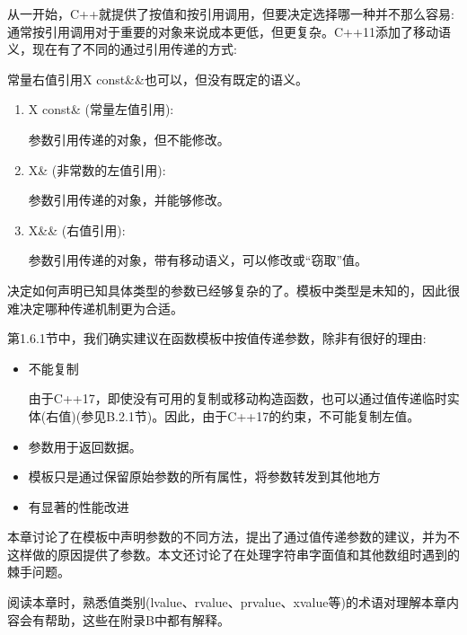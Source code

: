 从一开始，C++就提供了按值和按引用调用，但要决定选择哪一种并不那么容易:通常按引用调用对于重要的对象来说成本更低，但更复杂。C++11添加了移动语义，现在有了不同的通过引用传递的方式:

\begin{tcolorbox}[colback=webgreen!5!white,colframe=webgreen!75!black]
\hspace*{0.75cm}常量右值引用X const\&\&也可以，但没有既定的语义。
\end{tcolorbox}

\begin{enumerate}
\item 
X const\& (常量左值引用):

参数引用传递的对象，但不能修改。

\item 
X\& (非常数的左值引用):

参数引用传递的对象，并能够修改。

\item 
X\&\& (右值引用):

参数引用传递的对象，带有移动语义，可以修改或“窃取”值。
\end{enumerate}

决定如何声明已知具体类型的参数已经够复杂的了。模板中类型是未知的，因此很难决定哪种传递机制更为合适。

第1.6.1节中，我们确实建议在函数模板中按值传递参数，除非有很好的理由:

\begin{itemize}
\item 
不能复制

\begin{tcolorbox}[colback=webgreen!5!white,colframe=webgreen!75!black]
\hspace*{0.75cm}由于C++17，即使没有可用的复制或移动构造函数，也可以通过值传递临时实体(右值)(参见B.2.1节)。因此，由于C++17的约束，不可能复制左值。
\end{tcolorbox}

\item 
参数用于返回数据。

\item 
模板只是通过保留原始参数的所有属性，将参数转发到其他地方

\item 
有显著的性能改进
\end{itemize}

本章讨论了在模板中声明参数的不同方法，提出了通过值传递参数的建议，并为不这样做的原因提供了参数。本文还讨论了在处理字符串字面值和其他数组时遇到的棘手问题。

阅读本章时，熟悉值类别(lvalue、rvalue、prvalue、xvalue等)的术语对理解本章内容会有帮助，这些在附录B中都有解释。





























